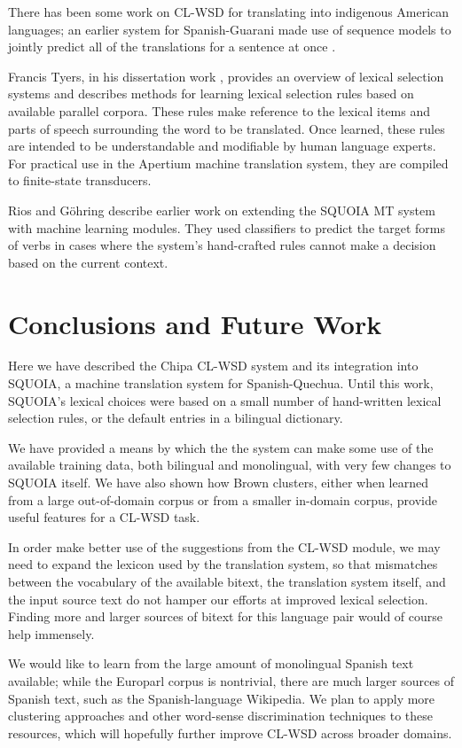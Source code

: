 \documentclass[10pt, a4paper]{article}
\begin{document}
There has been some work on CL-WSD for translating into indigenous American
languages; an earlier system for Spanish-Guarani made use of sequence models to
jointly predict all of the translations for a sentence at once
\cite{rudnick-gasser:2013:HyTra}.

Francis Tyers, in his dissertation work ,
provides an overview of lexical selection systems and describes methods for
learning lexical selection rules based on available parallel corpora. These
rules make reference to the lexical items and parts of speech surrounding the
word to be translated. Once learned, these rules are intended to be
understandable and modifiable by human language experts. For practical use in
the Apertium machine translation system, they are compiled to finite-state
transducers.

Rios and G\"{o}hring  describe
earlier work on extending the SQUOIA MT system with machine learning modules.
They used classifiers to predict the target forms of verbs in cases where the
system's hand-crafted rules cannot make a decision based on the current
context.

\section{Conclusions and Future Work}
Here we have described the Chipa CL-WSD system and its integration into SQUOIA,
a machine translation system for Spanish-Quechua.
Until this work, SQUOIA's lexical choices were based on a small number of
hand-written lexical selection rules, or the default entries in a bilingual
dictionary. 

We have provided a means by which the the system can make some use of
the available training data, both bilingual and monolingual, with very few
changes to SQUOIA itself. We have also shown how Brown clusters, either when
learned from a large out-of-domain corpus or from a smaller in-domain corpus,
provide useful features for a CL-WSD task.

In order make better use of the suggestions from the CL-WSD module, we may
need to expand the lexicon used by the translation system, so that mismatches
between the vocabulary of the available bitext, the translation system itself,
and the input source text do not hamper our efforts at improved lexical
selection. Finding more and larger sources of bitext for this language pair
would of course help immensely.

We would like to learn from the large amount of monolingual Spanish text
available; while the Europarl corpus is nontrivial, there are much larger
sources of Spanish text, such as the Spanish-language Wikipedia.  We plan
to apply more clustering approaches and other word-sense discrimination
techniques to these resources, which will hopefully further improve CL-WSD
across broader domains.
\end{document}

